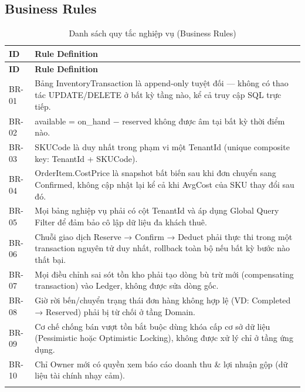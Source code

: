 \subsection{Business Rules}

\begin{longtable}{|p{1.6cm}|p{12cm}|}
    \hline
    \textbf{ID} & \textbf{Rule Definition} \\
    \hline
    \endfirsthead
    \hline
    \textbf{ID} & \textbf{Rule Definition} \\
    \hline
    \endhead
    BR-01 & Bảng InventoryTransaction là append-only tuyệt đối — không có thao tác UPDATE/DELETE ở bất kỳ tầng nào, kể cả truy cập SQL trực tiếp. \\
    \hline
    BR-02 & available = on\_hand − reserved không được âm tại bất kỳ thời điểm nào. \\
    \hline
    BR-03 & SKUCode là duy nhất trong phạm vi một TenantId (unique composite key: TenantId + SKUCode). \\
    \hline
    BR-04 & OrderItem.CostPrice là snapshot bất biến sau khi đơn chuyển sang Confirmed, không cập nhật lại kể cả khi AvgCost của SKU thay đổi sau đó. \\
    \hline
    BR-05 & Mọi bảng nghiệp vụ phải có cột TenantId và áp dụng Global Query Filter để đảm bảo cô lập dữ liệu đa khách thuê. \\
    \hline
    BR-06 & Chuỗi giao dịch Reserve → Confirm → Deduct phải thực thi trong một transaction nguyên tử duy nhất, rollback toàn bộ nếu bất kỳ bước nào thất bại. \\
    \hline
    BR-07 & Mọi điều chỉnh sai sót tồn kho phải tạo dòng bù trừ mới (compensating transaction) vào Ledger, không được sửa dòng gốc. \\
    \hline
    BR-08 & Giờ rời bến/chuyển trạng thái đơn hàng không hợp lệ (VD: Completed → Reserved) phải bị từ chối ở tầng Domain. \\
    \hline
    BR-09 & Cơ chế chống bán vượt tồn bắt buộc dùng khóa cấp cơ sở dữ liệu (Pessimistic hoặc Optimistic Locking), không được xử lý chỉ ở tầng ứng dụng. \\
    \hline
    BR-10 & Chỉ Owner mới có quyền xem báo cáo doanh thu \& lợi nhuận gộp (dữ liệu tài chính nhạy cảm). \\
    \hline
    \caption{Danh sách quy tắc nghiệp vụ (Business Rules)}
    \label{tab:business-rules}
\end{longtable}

